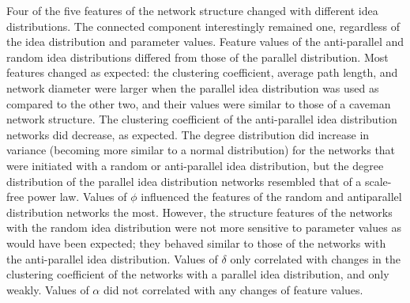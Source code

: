 Four of the five features of the network structure changed with different idea distributions. The connected component interestingly remained one, regardless of the idea distribution and parameter values. Feature values of the anti-parallel and random idea distributions differed from those of the parallel distribution. Most features changed as expected: the clustering coefficient, average path length, and network diameter were larger when the parallel idea distribution was used as compared to the other two, and their values were similar to those of a caveman network structure. The clustering coefficient of the anti-parallel idea distribution networks did decrease, as expected. The degree distribution did increase in variance (becoming more similar to a normal distribution) for the networks that were initiated with a random or anti-parallel idea distribution, but the degree distribution of the parallel idea distribution networks resembled that of a scale-free power law. Values of $\phi$ influenced the features of the random and antiparallel distribution networks the most. However, the structure features of the networks with the random idea distribution were not more sensitive to parameter values as would have been expected; they behaved similar to those of the networks with the anti-parallel idea distribution. Values of $\delta$ only correlated with changes in the clustering coefficient of the networks with a parallel idea distribution, and only weakly. Values of $\alpha$ did not correlated with any changes of feature values. 
